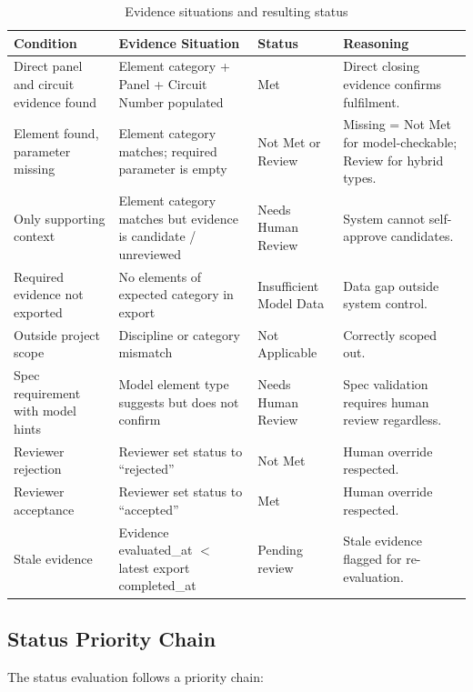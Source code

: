 \documentclass[10pt,letterpaper]{article}
\begin{document}
\begin{longtable}{p{1.6in}p{1.8in}p{1.0in}p{2.3in}}
\caption{Evidence situations and resulting status}
\label{tab:status-decision}\\
\toprule
\textbf{Condition} & \textbf{Evidence Situation} & \textbf{Status} & \textbf{Reasoning} \\
\midrule
\endhead
Direct panel and circuit evidence found & Element category + Panel + Circuit Number populated
  & Met & Direct closing evidence confirms fulfilment. \\
Element found, parameter missing & Element category matches; required parameter is empty
  & Not Met or Review & Missing = Not Met for model-checkable;
  Review for hybrid types. \\
Only supporting context & Element category matches but evidence is candidate / unreviewed
  & Needs Human Review & System cannot self-approve candidates. \\
Required evidence not exported & No elements of expected category in export & Insufficient
  Model Data & Data gap outside system control. \\
Outside project scope & Discipline or category mismatch & Not Applicable & Correctly scoped out. \\
Spec requirement with model hints & Model element type suggests but does not confirm
  & Needs Human Review & Spec validation requires human review regardless. \\
Reviewer rejection & Reviewer set status to ``rejected'' & Not Met & Human override respected. \\
Reviewer acceptance & Reviewer set status to ``accepted'' & Met & Human override respected. \\
Stale evidence & Evidence evaluated\_at $<$ latest export completed\_at & Pending review
  & Stale evidence flagged for re-evaluation. \\
\bottomrule
\end{longtable}

\subsection{Status Priority Chain}

The status evaluation follows a priority chain:
\end{document}
